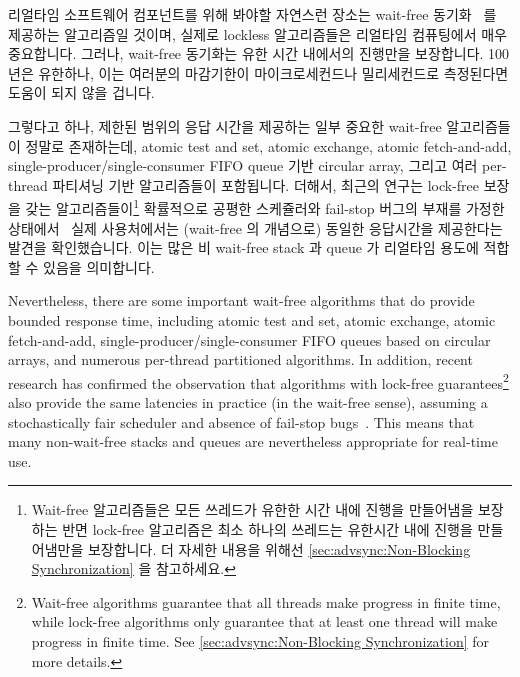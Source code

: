 리얼타임 소프트웨어 컴포넌트를 위해 봐야할 자연스런 장소는 wait-free
동기화~\cite{Herlihy91} 를 제공하는 알고리즘일 것이며, 실제로 lockless
알고리즘들은 리얼타임 컴퓨팅에서 매우 중요합니다.
그러나, wait-free 동기화는 유한 시간 내에서의 진행만을 보장합니다.
100년은 유한하나, 이는 여러분의 마감기한이 마이크로세컨드나 밀리세컨드로
측정된다면 도움이 되지 않을 겁니다.

그렇다고 하나, 제한된 범위의 응답 시간을 제공하는 일부 중요한 wait-free
알고리즘들이 정말로 존재하는데, atomic test and set, atomic exchange, atomic
fetch-and-add, single-producer/single-consumer FIFO queue 기반 circular array,
그리고 여러 per-thread 파티셔닝 기반 알고리즘들이 포함됩니다.
더해서, 최근의 연구는 lock-free 보장을 갖는 알고리즘들이\footnote{
	Wait-free 알고리즘들은 모든 쓰레드가 유한한 시간 내에 진행을 만들어냄을
	보장하는 반면 lock-free 알고리즘은 최소 하나의 쓰레드는 유한시간 내에
	진행을 만들어냄만을 보장합니다.
	더 자세한 내용을 위해선 \cref{sec:advsync:Non-Blocking Synchronization}
	을 참고하세요.}
확률적으로 공평한 스케쥴러와 fail-stop 버그의 부재를 가정한
상태에서~\cite{DanAlitarh2013PracticalProgress} 실제 사용처에서는 (wait-free 의
개념으로) 동일한 응답시간을 제공한다는 발견을 확인했습니다.
이는 많은 비 wait-free stack 과 queue 가 리얼타임 용도에 적합할 수 있음을
의미합니다.

\iffalse

Nevertheless, there are some important wait-free algorithms that do
provide bounded response time, including atomic test and set,
atomic exchange,
atomic fetch-and-add,
single-producer/single-consumer FIFO queues based on circular arrays,
and numerous per-thread partitioned algorithms.
In addition, recent research has confirmed the observation that
algorithms with lock-free guarantees\footnote{
	Wait-free algorithms guarantee that all threads make progress in
	finite time, while lock-free algorithms only guarantee that at
	least one thread will make progress in finite time.
	See \cref{sec:advsync:Non-Blocking Synchronization} for more details.}
also provide the same latencies in practice (in the wait-free sense),
assuming a stochastically fair scheduler and absence of fail-stop
bugs~\cite{DanAlitarh2013PracticalProgress}.
This means that many non-wait-free stacks and queues are nevertheless
appropriate for real-time use.

